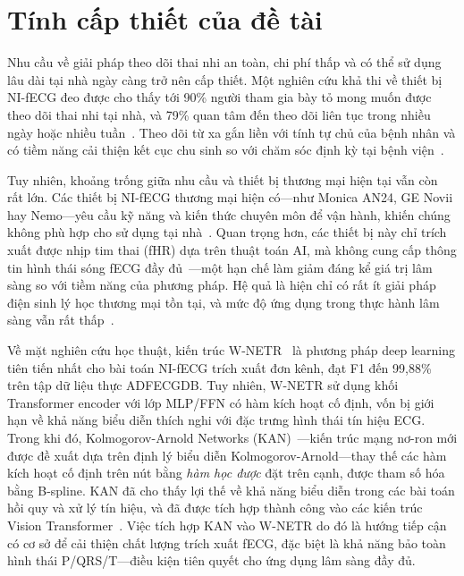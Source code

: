 \documentclass[../DoAn.tex]{subfiles}
\begin{document}
\section{Tính cấp thiết của đề tài}
\label{section:1.2}

Nhu cầu về giải pháp theo dõi thai nhi an toàn, chi phí thấp và có thể sử dụng lâu dài tại nhà ngày càng trở nên cấp thiết. Một nghiên cứu khả thi về thiết bị NI-fECG đeo được cho thấy tới 90\% người tham gia bày tỏ mong muốn được theo dõi thai nhi tại nhà, và 79\% quan tâm đến theo dõi liên tục trong nhiều ngày hoặc nhiều tuần~\cite{karmakarConsumerInsightsFeasibility2025}. Theo dõi từ xa gắn liền với tính tự chủ của bệnh nhân và có tiềm năng cải thiện kết cục chu sinh so với chăm sóc định kỳ tại bệnh viện~\cite{karmakarConsumerInsightsFeasibility2025}.

Tuy nhiên, khoảng trống giữa nhu cầu và thiết bị thương mại hiện tại vẫn còn rất lớn. Các thiết bị NI-fECG thương mại hiện có---như Monica AN24, GE Novii hay Nemo---yêu cầu kỹ năng và kiến thức chuyên môn để vận hành, khiến chúng không phù hợp cho sử dụng tại nhà~\cite{karmakarConsumerInsightsFeasibility2025}. Quan trọng hơn, các thiết bị này chỉ trích xuất được nhịp tim thai (fHR) dựa trên thuật toán AI, mà không cung cấp thông tin hình thái sóng fECG đầy đủ~\cite{karmakarConsumerInsightsFeasibility2025}---một hạn chế làm giảm đáng kể giá trị lâm sàng so với tiềm năng của phương pháp. Hệ quả là hiện chỉ có rất ít giải pháp điện sinh lý học thương mại tồn tại, và mức độ ứng dụng trong thực hành lâm sàng vẫn rất thấp~\cite{loversAdvancementsFetalHeart2025}.

Về mặt nghiên cứu học thuật, kiến trúc W-NETR~\cite{almadaniOneDimensionalWNETRNonInvasive2023} là phương pháp deep learning tiên tiến nhất cho bài toán NI-fECG trích xuất đơn kênh, đạt F1 đến 99,88\% trên tập dữ liệu thực ADFECGDB. Tuy nhiên, W-NETR sử dụng khối Transformer encoder với lớp MLP/FFN có hàm kích hoạt cố định, vốn bị giới hạn về khả năng biểu diễn thích nghi với đặc trưng hình thái tín hiệu ECG. Trong khi đó, Kolmogorov-Arnold Networks (KAN)~\cite{liuKANKolmogorovArnoldNetworks2025}---kiến trúc mạng nơ-ron mới được đề xuất dựa trên định lý biểu diễn Kolmogorov-Arnold---thay thế các hàm kích hoạt cố định trên nút bằng \textit{hàm học được} đặt trên cạnh, được tham số hóa bằng B-spline. KAN đã cho thấy lợi thế về khả năng biểu diễn trong các bài toán hồi quy và xử lý tín hiệu, và đã được tích hợp thành công vào các kiến trúc Vision Transformer~\cite{yeElevatingVisionTransformer2024}. Việc tích hợp KAN vào W-NETR do đó là hướng tiếp cận có cơ sở để cải thiện chất lượng trích xuất fECG, đặc biệt là khả năng bảo toàn hình thái P/QRS/T---điều kiện tiên quyết cho ứng dụng lâm sàng đầy đủ.
\end{document}
